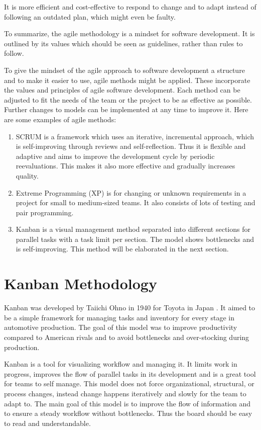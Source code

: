 \documentclass[runningheads]{llncs}
\begin{document}
It is more efficient and cost-effective to respond to change and to adapt instead of following an outdated plan, which might even be faulty.

To summarize, the agile methodology is a mindset for software development. It is outlined by its values\cite{ref_agilemanifesto}
which should be seen as guidelines, rather than rules to follow.

To give the mindset of the agile approach to software development a structure and to make it easier to use, agile methods might 
be applied. These incorporate the values and principles of agile software development. Each method can be adjusted to fit the 
needs of the team or the project to be as effective as possible. 
Further changes to models can be implemented at any time to improve it. Here are some examples of agile methods:

\begin{enumerate}
  \item SCRUM is a framework which uses an iterative, incremental approach, which is self-improving through reviews and self-reflection. 
  Thus it is flexible and adaptive and aims to improve the development cycle by periodic reevaluations. This makes it also more 
  effective and gradually increases quality.
  \item Extreme Programming (XP) is for changing or unknown requirements in a project for small to medium-sized teams. It also consists
  of lots of testing and pair programming.
  \item Kanban is a visual management method separated into different sections for parallel tasks with a task limit per section. The model 
  shows bottlenecks and is self-improving. This method will be elaborated in the next section.
\end{enumerate}

\section{Kanban Methodology}

Kanban was developed by Taiichi Ohno in 1940 for Toyota in Japan \cite{ref_kanban}. 
It aimed to be a simple framework for managing tasks and inventory for every stage in automotive production. The goal of this model 
was to improve productivity compared to American rivals and to avoid bottlenecks and over-stocking during production. 

Kanban is a tool for visualizing workflow and managing it. It limits work in progress, improves the flow of parallel tasks in its development 
and is a great tool for teams to self manage. This model does not force organizational, structural, or process changes, instead change happens 
iteratively and slowly for the team to adapt to. The main goal of this model is to improve the flow of information and to ensure a steady workflow 
without bottlenecks. Thus the board should be easy to read and understandable. 
\end{document}
